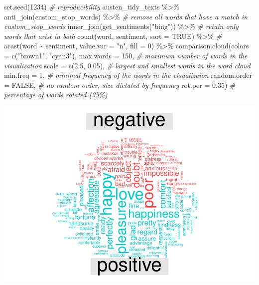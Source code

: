 \documentclass[
]{article}
\newenvironment{Shaded}{\begin{snugshade}}{\end{snugshade}}
\newcommand{\AttributeTok}[1]{\textcolor[rgb]{0.77,0.63,0.00}{#1}}
\newcommand{\CommentTok}[1]{\textcolor[rgb]{0.56,0.35,0.01}{\textit{#1}}}
\newcommand{\ConstantTok}[1]{\textcolor[rgb]{0.00,0.00,0.00}{#1}}
\newcommand{\DecValTok}[1]{\textcolor[rgb]{0.00,0.00,0.81}{#1}}
\newcommand{\FloatTok}[1]{\textcolor[rgb]{0.00,0.00,0.81}{#1}}
\newcommand{\FunctionTok}[1]{\textcolor[rgb]{0.00,0.00,0.00}{#1}}
\newcommand{\NormalTok}[1]{#1}
\newcommand{\SpecialCharTok}[1]{\textcolor[rgb]{0.00,0.00,0.00}{#1}}
\newcommand{\StringTok}[1]{\textcolor[rgb]{0.31,0.60,0.02}{#1}}
\begin{document}
\begin{Shaded}
\begin{Highlighting}[]
\FunctionTok{set.seed}\NormalTok{(}\DecValTok{1234}\NormalTok{) }\CommentTok{\# reproducibility}
\NormalTok{austen\_tidy\_texts }\SpecialCharTok{\%\textgreater{}\%}
  \FunctionTok{anti\_join}\NormalTok{(custom\_stop\_words) }\SpecialCharTok{\%\textgreater{}\%} \CommentTok{\# remove all words that have a match in custom\_stop\_words}
  \FunctionTok{inner\_join}\NormalTok{(}\FunctionTok{get\_sentiments}\NormalTok{(}\StringTok{"bing"}\NormalTok{)) }\SpecialCharTok{\%\textgreater{}\%} \CommentTok{\# retain only words that exist in both }
  \FunctionTok{count}\NormalTok{(word, sentiment, }\AttributeTok{sort =} \ConstantTok{TRUE}\NormalTok{) }\SpecialCharTok{\%\textgreater{}\%} \CommentTok{\#}
  \FunctionTok{acast}\NormalTok{(word }\SpecialCharTok{\textasciitilde{}}\NormalTok{ sentiment, }\AttributeTok{value.var =} \StringTok{"n"}\NormalTok{, }\AttributeTok{fill =} \DecValTok{0}\NormalTok{) }\SpecialCharTok{\%\textgreater{}\%}
  \FunctionTok{comparison.cloud}\NormalTok{(}\AttributeTok{colors =} \FunctionTok{c}\NormalTok{(}\StringTok{"brown1"}\NormalTok{, }\StringTok{"cyan3"}\NormalTok{),}
                   \AttributeTok{max.words =} \DecValTok{150}\NormalTok{, }\CommentTok{\# maximum number of words in the visualization}
                   \AttributeTok{scale =} \FunctionTok{c}\NormalTok{(}\FloatTok{2.5}\NormalTok{, }\FloatTok{0.05}\NormalTok{), }\CommentTok{\# largest and smallest words in the word cloud}
                   \AttributeTok{min.freq =} \DecValTok{1}\NormalTok{, }\CommentTok{\# minimal frequency of the words in the visualizaion}
                   \AttributeTok{random.order =} \ConstantTok{FALSE}\NormalTok{, }\CommentTok{\# no random order, size dictated by frequency}
                   \AttributeTok{rot.per =} \FloatTok{0.35}\NormalTok{) }\CommentTok{\# percentage of words rotated (35\%)}
\end{Highlighting}
\end{Shaded}

\includegraphics{Week8_files/figure-latex/unnamed-chunk-12-1.pdf}
\end{document}
